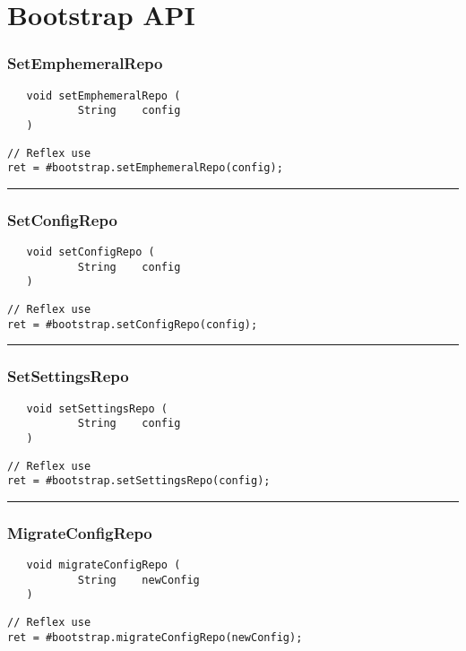 \section{Bootstrap API}

\subsubsection{SetEmphemeralRepo}
\label{Api:SetEmphemeralRepo}
\begin{verbatim}
   void setEmphemeralRepo (
           String    config
   )
\end{verbatim}
\begin{lstlisting}[language=reflex]
// Reflex use
ret = #bootstrap.setEmphemeralRepo(config);
\end{lstlisting}



\rule{15cm}{2pt}
\subsubsection{SetConfigRepo}
\label{Api:SetConfigRepo}
\begin{verbatim}
   void setConfigRepo (
           String    config
   )
\end{verbatim}
\begin{lstlisting}[language=reflex]
// Reflex use
ret = #bootstrap.setConfigRepo(config);
\end{lstlisting}



\rule{15cm}{2pt}
\subsubsection{SetSettingsRepo}
\label{Api:SetSettingsRepo}
\begin{verbatim}
   void setSettingsRepo (
           String    config
   )
\end{verbatim}
\begin{lstlisting}[language=reflex]
// Reflex use
ret = #bootstrap.setSettingsRepo(config);
\end{lstlisting}



\rule{15cm}{2pt}
\subsubsection{MigrateConfigRepo}
\label{Api:MigrateConfigRepo}
\begin{verbatim}
   void migrateConfigRepo (
           String    newConfig
   )
\end{verbatim}
\begin{lstlisting}[language=reflex]
// Reflex use
ret = #bootstrap.migrateConfigRepo(newConfig);
\end{lstlisting}



